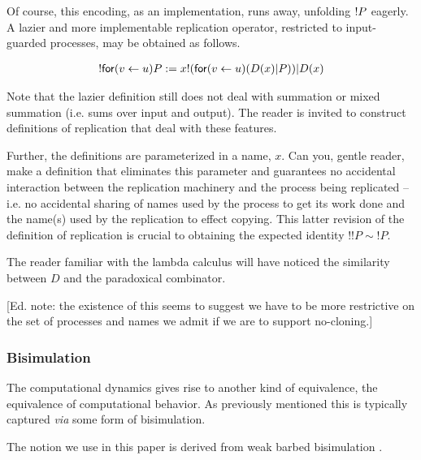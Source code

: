Of course, this encoding, as an implementation, runs away, unfolding
$\bangp{P}$ eagerly. A lazier and more implementable replication
operator, restricted to input-guarded processes, may be obtained as follows.

\begin{eqnarray}
\bangp{\prefix{u}{v}{P}} 
	:= 
	\binpar{\lift{x}{\prefix{u}{v}{(\binpar{D(x)}{P})}}}{D(x)} \nonumber
\end{eqnarray}

\begin{remark}
  Note that the lazier definition still does not deal with summation
  or mixed summation (i.e. sums over input and output). The reader is
  invited to construct definitions of replication that deal with these
  features. 

  Further, the definitions are parameterized in a name, $x$. Can you,
  gentle reader, make a definition that eliminates this parameter and
  guarantees no accidental interaction between the replication
  machinery and the process being replicated -- i.e. no accidental
  sharing of names used by the process to get its work done and the
  name(s) used by the replication to effect copying. This latter
  revision of the definition of replication is crucial to obtaining
  the expected identity $!!P \sim !P$.
\end{remark}

\begin{remark}\label{rem:paradoxical_combinator}
  The reader familiar with the lambda calculus will have noticed the
  similarity between $D$ and the paradoxical combinator.

  [Ed. note: the existence of this seems to suggest we have to be more
  restrictive on the set of processes and names we admit if we are to
  support no-cloning.]
\end{remark}

\subsubsection{Bisimulation}

The computational dynamics gives rise to another kind of equivalence,
the equivalence of computational behavior. As previously mentioned
this is typically captured \emph{via} some form of bisimulation.


The notion we use in this paper is derived from weak barbed
bisimulation \cite{milner91polyadicpi}. 

